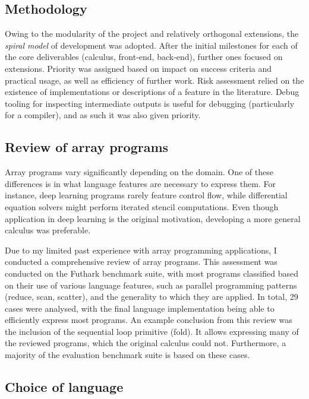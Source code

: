 \subsection{Methodology}

Owing to the modularity of the project and relatively orthogonal extensions, the \textit{spiral model} of development was adopted. After the initial milestones for each of the core deliverables (calculus, front-end, back-end), further ones focused on extensions. Priority was assigned based on impact on success criteria and practical usage, as well as efficiency of further work. Risk assessment relied on the existence of implementations or descriptions of a feature in the literature. Debug tooling for inspecting intermediate outputs is useful for debugging (particularly for a compiler), and as such it was also given priority.

\subsection{Review of array programs}
\label{suite-review}

Array programs vary significantly depending on the domain. One of these differences is in what language features are necessary to express them. For instance, deep learning programs rarely feature control flow, while differential equation solvers might perform iterated stencil computations. Even though application in deep learning is the original motivation, developing a more general calculus was preferable.

Due to my limited past experience with array programming applications, I conducted a comprehensive review of array programs. This assessment was conducted on the Futhark benchmark suite, with most programs classified based on their use of various language features, such as parallel programming patterns (reduce, scan, scatter), and the generality to which they are applied. In total, 29 cases were analysed, with the final language implementation being able to efficiently express most programs.
An example conclusion from this review was the inclusion of the sequential loop primitive (fold). It allows expressing many of the reviewed programs, which the original calculus could not. 
Furthermore, a majority of the evaluation benchmark suite is based on these cases. 

\subsection{Choice of language}

